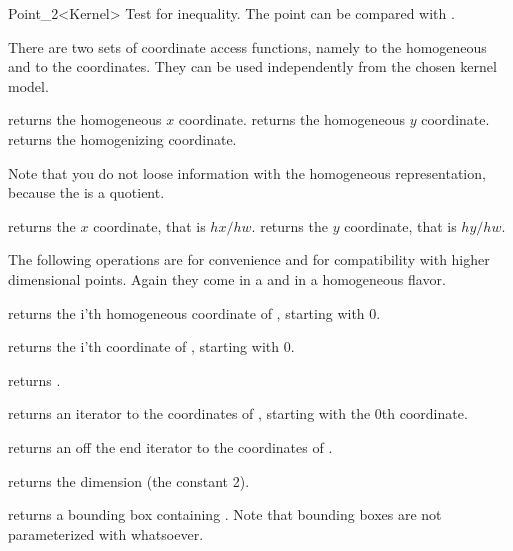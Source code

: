 \begin{ccRefClass} {Point_2<Kernel>}
       {Test for inequality. The point can be compared with .}

There are two sets of coordinate access functions, namely to the
homogeneous and to the  coordinates. They can be used
independently from the chosen kernel model.

       {returns the homogeneous $x$ coordinate.}
\ccGlue
{}
       {returns the homogeneous $y$ coordinate.}
\ccGlue
{}
       {returns the homogenizing  coordinate.}
       
Note that you do not loose information with the homogeneous
representation, because the  is a quotient.

       {returns the  $x$ coordinate, that is $hx/hw$.}
\ccGlue
{}
       {returns the  $y$ coordinate, that is $hy/hw$.}
       
The following operations are for convenience and for compatibility
with higher dimensional points. Again they come in a
 and in a homogeneous flavor.

       {returns the i'th homogeneous coordinate of \ccVar, starting with 0.
        }

       {returns the i'th  coordinate of \ccVar, starting with 0.
        }


       {returns .
        }

       {returns an iterator to the  coordinates 
        of \ccVar, starting with the 0th coordinate.}

       {returns an off the end iterator to the  
        coordinates of \ccVar.}

       {returns the dimension (the constant 2).}

       {returns a bounding box containing \ccVar. Note that bounding boxes
        are not parameterized with whatsoever. }


\end{ccRefClass}
